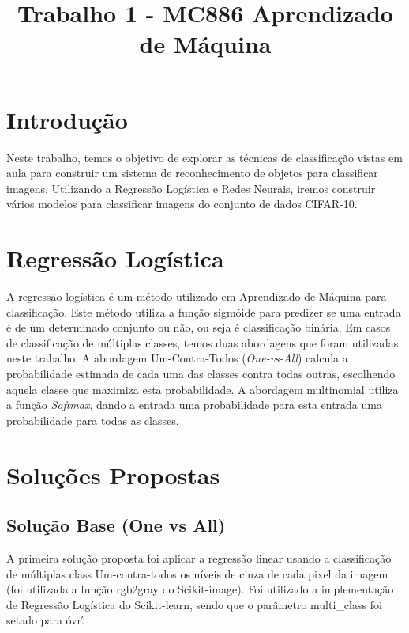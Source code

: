 \documentclass[conference]{IEEEtran}
\begin{document}
\title{Trabalho 1 - MC886 Aprendizado de Máquina}

\author{
\and
{}
}

\maketitle

\section{Introdução}


Neste trabalho, temos o objetivo de explorar as técnicas de classificação vistas em aula para construir um sistema de reconhecimento de objetos para classificar imagens. Utilizando a Regressão Logística e Redes Neurais, iremos construir vários modelos para classificar imagens do conjunto de dados CIFAR-10.

\section{Regressão Logística}
 
A regressão logística é um método utilizado em Aprendizado de Máquina para classificação. Este método utiliza a função sigmóide para predizer se uma entrada é de um determinado conjunto ou não, ou seja é classificação binária.
Em casos de classificação de múltiplas classes, temos duas abordagens que foram utilizadas neste trabalho.
A abordagem Um-Contra-Todos (\textit{One-vs-All}) calcula a probabilidade estimada de cada uma das classes contra todas outras, escolhendo aquela classe que maximiza esta probabilidade.
A abordagem multinomial utiliza a função \textit{Softmax}, dando a entrada uma probabilidade para esta entrada uma probabilidade para todas as classes.

\section{Soluções Propostas}

\subsection{Solução Base (One vs All)}
A primeira solução proposta foi aplicar a regressão linear usando a classificação de múltiplas class Um-contra-todos os níveis de cinza de cada pixel da imagem (foi utilizada a função rgb2gray do Scikit-image). Foi utilizado a implementação de Regressão Logística do Scikit-learn, sendo que o parâmetro multi\_class foi setado para \'ovr\'.
\end{document}
